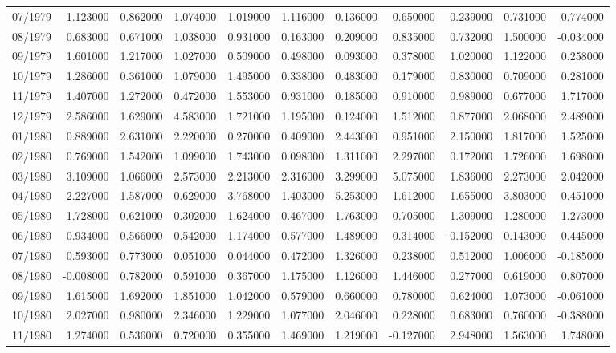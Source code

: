 \begin{tabular}{lrrrrrrrrrr}
07/1979 & 1.123000 & 0.862000 & 1.074000 & 1.019000 & 1.116000 & 0.136000 & 0.650000 & 0.239000 & 0.731000 & 0.774000 \\
08/1979 & 0.683000 & 0.671000 & 1.038000 & 0.931000 & 0.163000 & 0.209000 & 0.835000 & 0.732000 & 1.500000 & -0.034000 \\
09/1979 & 1.601000 & 1.217000 & 1.027000 & 0.509000 & 0.498000 & 0.093000 & 0.378000 & 1.020000 & 1.122000 & 0.258000 \\
10/1979 & 1.286000 & 0.361000 & 1.079000 & 1.495000 & 0.338000 & 0.483000 & 0.179000 & 0.830000 & 0.709000 & 0.281000 \\
11/1979 & 1.407000 & 1.272000 & 0.472000 & 1.553000 & 0.931000 & 0.185000 & 0.910000 & 0.989000 & 0.677000 & 1.717000 \\
12/1979 & 2.586000 & 1.629000 & 4.583000 & 1.721000 & 1.195000 & 0.124000 & 1.512000 & 0.877000 & 2.068000 & 2.489000 \\
01/1980 & 0.889000 & 2.631000 & 2.220000 & 0.270000 & 0.409000 & 2.443000 & 0.951000 & 2.150000 & 1.817000 & 1.525000 \\
02/1980 & 0.769000 & 1.542000 & 1.099000 & 1.743000 & 0.098000 & 1.311000 & 2.297000 & 0.172000 & 1.726000 & 1.698000 \\
03/1980 & 3.109000 & 1.066000 & 2.573000 & 2.213000 & 2.316000 & 3.299000 & 5.075000 & 1.836000 & 2.273000 & 2.042000 \\
04/1980 & 2.227000 & 1.587000 & 0.629000 & 3.768000 & 1.403000 & 5.253000 & 1.612000 & 1.655000 & 3.803000 & 0.451000 \\
05/1980 & 1.728000 & 0.621000 & 0.302000 & 1.624000 & 0.467000 & 1.763000 & 0.705000 & 1.309000 & 1.280000 & 1.273000 \\
06/1980 & 0.934000 & 0.566000 & 0.542000 & 1.174000 & 0.577000 & 1.489000 & 0.314000 & -0.152000 & 0.143000 & 0.445000 \\
07/1980 & 0.593000 & 0.773000 & 0.051000 & 0.044000 & 0.472000 & 1.326000 & 0.238000 & 0.512000 & 1.006000 & -0.185000 \\
08/1980 & -0.008000 & 0.782000 & 0.591000 & 0.367000 & 1.175000 & 1.126000 & 1.446000 & 0.277000 & 0.619000 & 0.807000 \\
09/1980 & 1.615000 & 1.692000 & 1.851000 & 1.042000 & 0.579000 & 0.660000 & 0.780000 & 0.624000 & 1.073000 & -0.061000 \\
10/1980 & 2.027000 & 0.980000 & 2.346000 & 1.229000 & 1.077000 & 2.046000 & 0.228000 & 0.683000 & 0.760000 & -0.388000 \\
11/1980 & 1.274000 & 0.536000 & 0.720000 & 0.355000 & 1.469000 & 1.219000 & -0.127000 & 2.948000 & 1.563000 & 1.748000 \\

\end{tabular}
